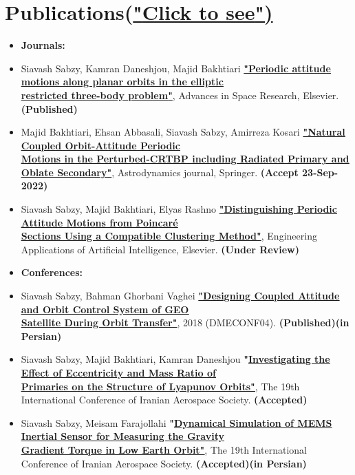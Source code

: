 \documentclass[10pt,a4paper,times]{moderncv}
\begin{document}
\section{Publications(\href{https://www.researchgate.net/profile/Siavash_Sabzy/publications}{"\underline{Click to see}")}}
\begin{itemize}

\item\textbf{Journals:}
\item Siavash Sabzy, Kamran Daneshjou, Majid Bakhtiari 
 \textbf{\href{https://doi.org/10.1016/j.asr.2021.01.019}{"\underline{Periodic attitude motions along planar orbits in the elliptic } \\ \underline{restricted three-body problem}"}}, Advances in Space Research, Elsevier. \textbf{(Published)}
\item  Majid Bakhtiari, Ehsan Abbasali, Siavash Sabzy, Amirreza Kosari 
 \textbf{\href{https://link.springer.com/article/10.1007/s42064-022-0154-0}{"\underline{Natural Coupled Orbit-Attitude Periodic } \\ \underline{Motions in the Perturbed-CRTBP including Radiated Primary and Oblate Secondary}"}}, Astrodynamics journal, Springer. \textbf{(Accept 23-Sep-2022)}
\item Siavash Sabzy, Majid Bakhtiari, Elyas Rashno 
 \textbf{\href{https://track.authorhub.elsevier.com/?uuid=ebf31065-52e8-4eb0-a725-fa0055a3f2ea}{"\underline{Distinguishing Periodic Attitude Motions from Poincaré} \\ \underline{Sections Using a Compatible Clustering Method}"}}, Engineering Applications of Artificial Intelligence, Elsevier. \textbf{(Under Review)}\\

\item\textbf{Conferences:}
\item Siavash Sabzy, Bahman Ghorbani Vaghei
 \textbf{\href{https://civilica.com/doc/881918/}{"\underline{Designing Coupled Attitude and Orbit Control System of GEO} \\ \href{https://civilica.com/doc/881918/}{\underline{Satellite During Orbit Transfer"}}}}, 2018 (DMECONF04). \textbf{(Published)(in Persian)}
 
 \item Siavash Sabzy, Majid Bakhtiari, Kamran Daneshjou
 \textbf{"\href{https://civilica.com/doc/1362193}{\underline{Investigating the Effect of Eccentricity and Mass Ratio of}} \\ \href{https://civilica.com/doc/1362193}{\underline{Primaries on the Structure of Lyapunov Orbits"}}}, The 19th International Conference of Iranian Aerospace Society. \textbf{(Accepted)}
 
 \item Siavash Sabzy, Meisam Farajollahi
 \textbf{"\href{https://civilica.com/doc/1362348/}{\underline{Dynamical Simulation of MEMS Inertial Sensor for Measuring the Gravity}}\\\href{https://civilica.com/doc/1362348/}{\underline{Gradient Torque in Low Earth Orbit"}}}, The 19th International Conference of Iranian Aerospace Society. \textbf{(Accepted)(in Persian)} 
\end{itemize}
\end{document}
